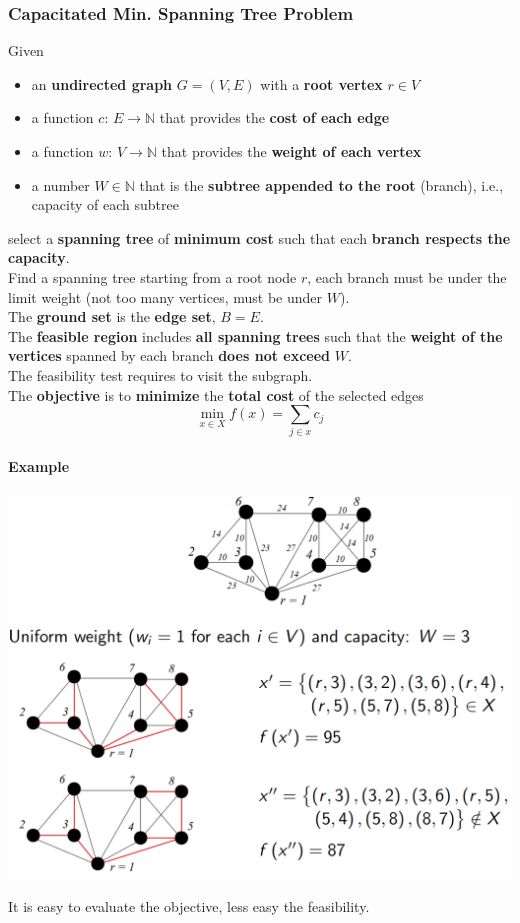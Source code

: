 \newpage

\subsubsection{Capacitated Min. Spanning Tree Problem}
Given
\begin{itemize}
	\item an \textbf{undirected graph} $G = (V , E )$ with a \textbf{root vertex} $r \in V$
	\item a function $c : \, E \rightarrow \mathbb{N}$ that provides the \textbf{cost of each edge}
	\item a function $w : \, V \rightarrow \mathbb{N}$ that provides the \textbf{weight of each vertex}
	\item a number $W \in \mathbb{N}$ that is the \textbf{subtree appended to the root} (branch), i.e., capacity of each subtree
\end{itemize}
select a \textbf{spanning tree} of \textbf{minimum cost} such that each \textbf{branch respects the capacity}.\\
Find a spanning tree starting from a root node $r$, each branch must be under the limit weight (not too many vertices, must be under $W$).\\

The \textbf{ground set} is the \textbf{edge set}, $B = E$.\\

The \textbf{feasible region} includes \textbf{all spanning trees} such that the \textbf{weight of the vertices} spanned by each branch \textbf{does not exceed} $W$.\\
The feasibility test requires to visit the subgraph.\\

The \textbf{objective} is to \textbf{minimize} the \textbf{total cost} of the selected edges
$$ \min_{x \in X} f(x) = \sum_{j \in x} c_j $$

\newpage

\paragraph{Example}
\begin{center}
	\includegraphics[width=0.8\columnwidth]{img/CSTP}
\end{center}
It is easy to evaluate the objective, less easy the feasibility.

